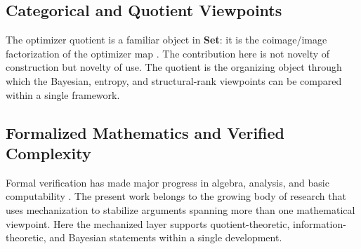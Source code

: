 \subsection{Categorical and Quotient Viewpoints}

The optimizer quotient is a familiar object in \textbf{Set}: it is the coimage/image factorization of the optimizer map \cite{maclane1998categories}. The contribution here is not novelty of construction but novelty of use. The quotient is the organizing object through which the Bayesian, entropy, and structural-rank viewpoints can be compared within a single framework.

\subsection{Formalized Mathematics and Verified Complexity}

Formal verification has made major progress in algebra, analysis, and basic computability \cite{forster2019verified,kunze2019formal,nipkow2002isabelle,mathlib2020,demoura2021lean4}. The present work belongs to the growing body of research that uses mechanization to stabilize arguments spanning more than one mathematical viewpoint. Here the mechanized layer supports quotient-theoretic, information-theoretic, and Bayesian statements within a single development.
